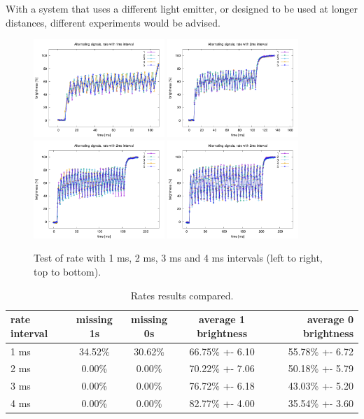 With a system that uses a different light emitter, or designed to be used at longer distances, different experiments would be advised.
\begin{figure}[hbt]
\centering
  \includegraphics[height=140px]{img/overlap1}
  \includegraphics[height=140px]{img/overlap2}
  \includegraphics[height=140px]{img/overlap3}
  \includegraphics[height=140px]{img/overlap4}
  \caption{Test of rate with 1 ms, 2 ms, 3 ms and 4 ms intervals (left to right, top to bottom).}
  \label{fig:txpeak}
\end{figure}

\begin{table}[hbt]
\centering
 \begin{tabular}{l c c c r}
   rate interval & missing 1s & missing 0s & average 1 brightness & average 0 brightness \\
   \hline
   1 ms & 34.52\% & 30.62\% & 66.75\% +- 6.10 & 55.78\% +- 6.72 \\
   2 ms & 0.00\% & 0.00\% & 70.22\% +- 7.06 & 50.18\% +- 5.79 \\
   3 ms & 0.00\% & 0.00\% & 76.72\% +- 6.18 & 43.03\% +- 5.20 \\
   4 ms & 0.00\% & 0.00\% & 82.77\% +- 4.00 & 35.54\% +- 3.60 \\
   \hline
	\end{tabular}
  \caption{Rates results compared.}
  \label{ratestable}
\end{table}

